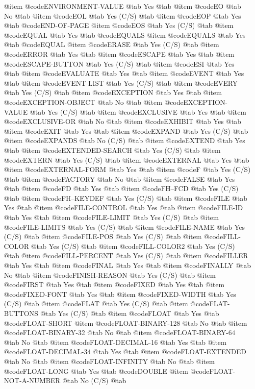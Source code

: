 @item @code{ENVIRONMENT-VALUE} @tab Yes @tab
@item @code{EO} @tab No @tab
@item @code{EOL} @tab Yes	(C/S) @tab
@item @code{EOP} @tab Yes @tab @code{END-OF-PAGE}
@item @code{EOS} @tab Yes	(C/S) @tab
@item @code{EQUAL} @tab Yes @tab @code{EQUALS}
@item @code{EQUALS} @tab Yes @tab @code{EQUAL}
@item @code{ERASE} @tab Yes	(C/S) @tab
@item @code{ERROR} @tab Yes @tab
@item @code{ESCAPE} @tab Yes @tab
@item @code{ESCAPE-BUTTON} @tab Yes	(C/S) @tab
@item @code{ESI} @tab Yes @tab
@item @code{EVALUATE} @tab Yes @tab
@item @code{EVENT} @tab Yes @tab
@item @code{EVENT-LIST} @tab Yes	(C/S) @tab
@item @code{EVERY} @tab Yes	(C/S) @tab
@item @code{EXCEPTION} @tab Yes @tab
@item @code{EXCEPTION-OBJECT} @tab No @tab
@item @code{EXCEPTION-VALUE} @tab Yes	(C/S) @tab
@item @code{EXCLUSIVE} @tab Yes @tab
@item @code{EXCLUSIVE-OR} @tab No @tab
@item @code{EXHIBIT} @tab Yes @tab
@item @code{EXIT} @tab Yes @tab
@item @code{EXPAND} @tab Yes	(C/S) @tab
@item @code{EXPANDS} @tab No	(C/S) @tab
@item @code{EXTEND} @tab Yes @tab
@item @code{EXTENDED-SEARCH} @tab Yes (C/S) @tab
@item @code{EXTERN} @tab Yes	(C/S) @tab
@item @code{EXTERNAL} @tab Yes @tab
@item @code{EXTERNAL-FORM} @tab Yes @tab
@item @code{F} @tab Yes	(C/S) @tab
@item @code{FACTORY} @tab No @tab
@item @code{FALSE} @tab Yes @tab
@item @code{FD} @tab Yes @tab
@item @code{FH--FCD} @tab Yes	(C/S) @tab
@item @code{FH--KEYDEF} @tab Yes	(C/S) @tab
@item @code{FILE} @tab Yes @tab
@item @code{FILE-CONTROL} @tab Yes @tab
@item @code{FILE-ID} @tab Yes @tab
@item @code{FILE-LIMIT} @tab Yes (C/S) @tab
@item @code{FILE-LIMITS} @tab Yes (C/S) @tab
@item @code{FILE-NAME} @tab Yes	(C/S) @tab
@item @code{FILE-POS} @tab Yes	(C/S) @tab
@item @code{FILL-COLOR} @tab Yes	(C/S) @tab
@item @code{FILL-COLOR2} @tab Yes	(C/S) @tab
@item @code{FILL-PERCENT} @tab Yes	(C/S) @tab
@item @code{FILLER} @tab Yes @tab
@item @code{FINAL} @tab Yes @tab
@item @code{FINALLY} @tab No @tab
@item @code{FINISH-REASON} @tab Yes	(C/S) @tab
@item @code{FIRST} @tab Yes @tab
@item @code{FIXED} @tab Yes @tab
@item @code{FIXED-FONT} @tab Yes @tab
@item @code{FIXED-WIDTH} @tab Yes	(C/S) @tab
@item @code{FLAT} @tab Yes	(C/S) @tab
@item @code{FLAT-BUTTONS} @tab Yes	(C/S) @tab
@item @code{FLOAT} @tab Yes @tab @code{FLOAT-SHORT}
@item @code{FLOAT-BINARY-128} @tab No @tab
@item @code{FLOAT-BINARY-32} @tab No @tab
@item @code{FLOAT-BINARY-64} @tab No @tab
@item @code{FLOAT-DECIMAL-16} @tab Yes @tab
@item @code{FLOAT-DECIMAL-34} @tab Yes @tab
@item @code{FLOAT-EXTENDED} @tab No @tab
@item @code{FLOAT-INFINITY} @tab No @tab
@item @code{FLOAT-LONG} @tab Yes @tab @code{DOUBLE}
@item @code{FLOAT-NOT-A-NUMBER} @tab No	(C/S) @tab
